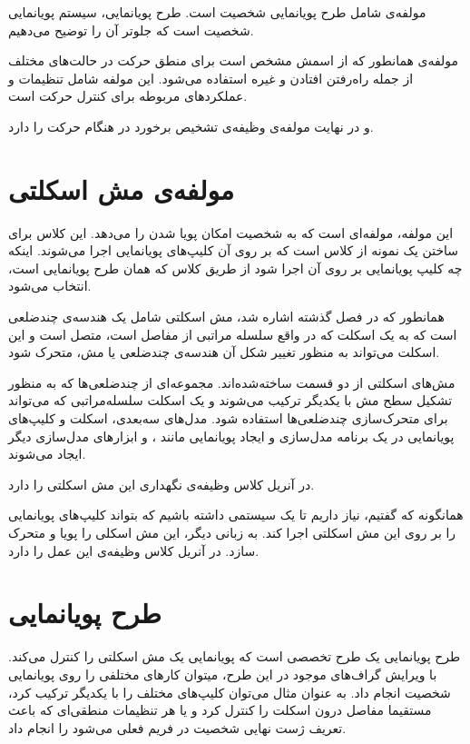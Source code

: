 مولفه‌ی 
شامل طرح پویانمایی شخصیت است. طرح پویانمایی، سیستم پویانمایی شخصیت است که جلوتر آن را توضیح می‌دهیم.


مولفه‌ی 
همانطور که از اسمش مشخص است برای منطق حرکت در حالت‌های مختلف از جمله راه‌رفتن افتادن و غیره استفاده می‌شود.
این مولفه شامل تنظیمات و عملکرد‌های مربوطه برای کنترل حرکت است.

و در نهایت مولفه‌‌ی
وظیفه‌ی تشخیص برخورد در هنگام حرکت را دارد.


\section{مولفه‌ی مش اسکلتی}

این مولفه‌، مولفه‌ای است که به شخصیت امکان پویا شدن را می‌دهد.
این کلاس برای ساختن یک نمونه از کلاس 
است که بر روی آن کلیپ‌های پویانمایی اجرا می‌شوند.
اینکه چه کلیپ پویانمایی بر روی آن اجرا شود از طریق کلاس 
که همان طرح پویانمایی
 است، انتخاب می‌شود.

همانطور که در فصل گذشته اشاره شد، مش اسکلتی 
شامل یک هندسه‌ی چندضلعی است که به یک اسکلت که در واقع 
سلسله مراتبی از مفاصل است، متصل است و این اسکلت می‌تواند به 
منظور تغییر شکل آن هندسه‌ی چندضلعی یا مش، متحرک شود.

مش‌های اسکلتی از دو قسمت ساخته‌شده‌اند. مجموعه‌ای از چندضلعی‌ها
که به منظور تشکیل سطح مش با یکدیگر ترکیب می‌شوند و 
یک اسکلت سلسله‌مراتبی که می‌تواند برای متحرک‌سازی چند‌ضلعی‌ها استفاده شود.
مدل‌های سه‌بعدی، 
اسکلت
و کلیپ‌های پویانمایی 
در یک برنامه مدل‌سازی و ایجاد پویانمایی
مانند 
،
و ابزار‌های مدل‌سازی دیگر ایجاد می‌شوند.

در آنریل کلاس 
وظیفه‌ی نگهداری این مش اسکلتی را دارد.

همانگونه که گفتیم، نیاز داریم تا یک سیستمی داشته باشیم 
که بتواند کلیپ‌های پویانمایی را بر روی 
این مش اسکلتی اجرا کند. به زبانی دیگر، این 
مش اسکلی را پویا و متحرک سازد.
در آنریل کلاس 
وظیفه‌ی این عمل را دارد.

\section{طرح پویانمایی}

طرح پویانمایی یک طرح تخصصی است که پویانمایی 
یک مش اسکلتی را کنترل می‌کند.
با ویرایش گراف‌های موجود در این طرح، 
میتوان کار‌های مختلفی را روی پویانمایی شخصیت انجام داد.
به عنوان مثال می‌توان کلیپ‌های مختلف را با یکدیگر ترکیب کرد،
مستقیما مفاصل درون اسکلت را کنترل کرد و
یا هر تنظیمات منطقی‌ای که باعث تعریف 
ژست نهایی شخصیت در فریم فعلی می‌شود را انجام داد.

